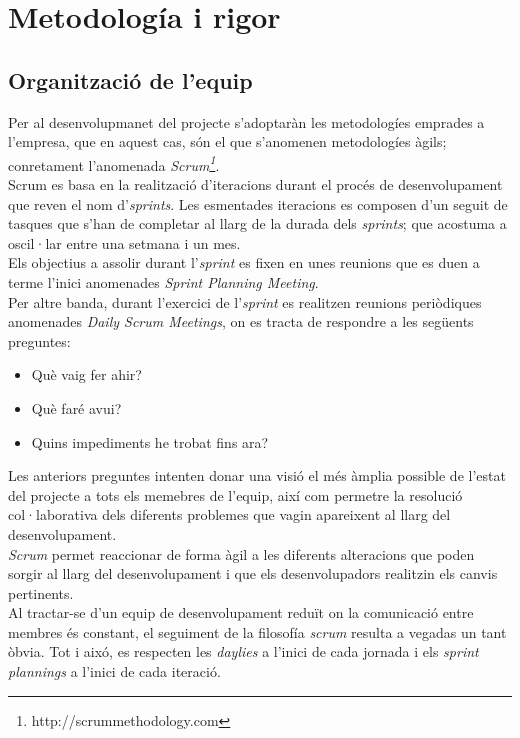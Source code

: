 \section{Metodología i rigor}

\subsection{Organització de l'equip}

Per al desenvolupmanet del projecte s'adoptaràn les metodologíes emprades a l'empresa, que en aquest cas, són el que s'anomenen metodologíes àgils; conretament l'anomenada \textit{Scrum\footnote{http://scrummethodology.com}}.\\
Scrum es basa en la realització d'iteracions durant el procés de desenvolupament que reven el nom d'\textit{sprints}. Les esmentades iteracions es composen d'un seguit de tasques que s'han de completar al llarg de la durada dels \textit{sprints}; que acostuma a oscil·lar entre una setmana i un mes.\\
Els objectius a assolir durant l'\textit{sprint} es fixen en unes reunions que es duen a terme l'inici anomenades \textit{Sprint Planning Meeting}.\\
Per altre banda, durant l'exercici de l'\textit{sprint} es realitzen reunions periòdiques anomenades \textit{Daily Scrum Meetings}, on es tracta de respondre a les següents preguntes:

\begin{itemize}
	\item Què vaig fer ahir?
	\item Què faré avui?
	\item Quins impediments he trobat fins ara?
\end{itemize}
Les anteriors preguntes intenten donar una visió el més àmplia possible de l'estat del projecte a tots els memebres de l'equip, així com permetre la resolució col·laborativa dels diferents problemes que vagin apareixent al llarg del desenvolupament.\\
\textit{Scrum} permet reaccionar de forma àgil a les diferents alteracions que poden sorgir al llarg del desenvolupament i que els desenvolupadors realitzin els canvis pertinents.\\
Al tractar-se d'un equip de desenvolupament reduït on la comunicació entre membres és constant, el seguiment de la filosofía \textit{scrum} resulta a vegadas un tant òbvia. Tot i aixó, es respecten les \textit{daylies} a l'inici de cada jornada i els \textit{sprint plannings} a l'inici de cada iteració.

